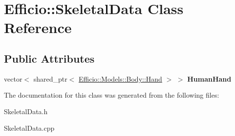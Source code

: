 \hypertarget{class_efficio_1_1_skeletal_data}{}\section{Efficio\+:\+:Skeletal\+Data Class Reference}
\label{class_efficio_1_1_skeletal_data}
\subsection*{Public Attributes}
\begin{DoxyCompactItemize}
\item 
vector$<$ shared\+\_\+ptr$<$ \hyperlink{class_efficio_1_1_models_1_1_body_1_1_hand}{Efficio\+::\+Models\+::\+Body\+::\+Hand} $>$ $>$ {\bfseries Human\+Hand}\hypertarget{class_efficio_1_1_skeletal_data_a634847b9c511819aca2054b551cd2082}{}\label{class_efficio_1_1_skeletal_data_a634847b9c511819aca2054b551cd2082}

\end{DoxyCompactItemize}


The documentation for this class was generated from the following files\+:\begin{DoxyCompactItemize}
\item 
Skeletal\+Data.\+h\item 
Skeletal\+Data.\+cpp\end{DoxyCompactItemize}
